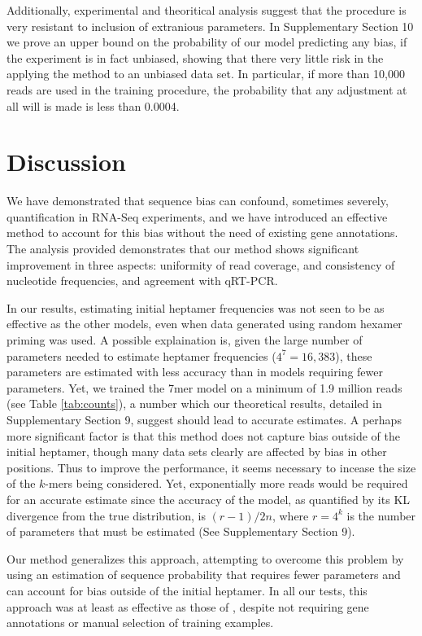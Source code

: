 \documentclass{bioinfo}
\begin{document}
Additionally, experimental and theoritical analysis suggest that the procedure
is very resistant to inclusion of extranious parameters. In Supplementary
Section 10 we prove an upper bound on the probability of our model predicting
any bias, if the experiment is in fact unbiased, showing that there very little
risk in the applying the method to an unbiased data set. In particular, if more
than 10,000 reads are used in the training procedure, the probability that any
adjustment at all will is made is less than 0.0004.

\section{Discussion}

We have demonstrated that sequence bias can confound, sometimes severely,
quantification in RNA-Seq experiments, and we have introduced an effective
method to account for this bias without the need of existing gene annotations.
The analysis provided demonstrates that our method shows significant improvement
in three aspects: uniformity of read coverage, and consistency of nucleotide
frequencies, and agreement with qRT-PCR.

In our results, estimating initial heptamer frequencies was not seen to be as
effective as the other models, even when data generated using random hexamer
priming was used. A possible explaination is, given the large number of
parameters needed to estimate heptamer frequencies ($4^{7} = 16,383$), these
parameters are estimated with less accuracy than in models requiring fewer
parameters. Yet, we trained the 7mer model on a minimum of 1.9 million reads
(see Table \ref{tab:counts}), a number which our theoretical results, detailed
in Supplementary Section 9, suggest should lead to accurate estimates. A perhaps
more significant factor is that this method does not capture bias outside of the
initial heptamer, though many data sets clearly are affected by bias in other
positions.  Thus to improve the performance, it seems necessary to incease the
size of the $k$-mers being considered. Yet, exponentially more reads would be
required for an accurate estimate since the accuracy of the model, as quantified
by its KL divergence from the true distribution, is $(r-1)/2n$, where $r=4^k$ is
the number of parameters that must be estimated (See Supplementary Section 9).

Our method generalizes this approach, attempting to overcome this problem by
using an estimation of sequence probability that requires fewer parameters
and can account for bias outside of the initial heptamer. In all our tests, this
approach was at least as effective as those of \citet{Li2010}, despite not
requiring gene annotations or manual selection of training examples.
\end{document}
